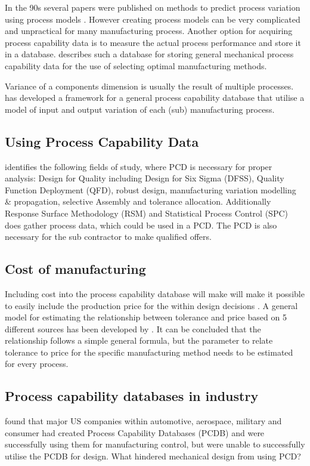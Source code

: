 \documentclass[aip,amsmath, reprint, author-year]{revtex4-1}
\begin{document}
In the 90s several papers were published on methods to predict process variation using process models \citep{thornton2000use}. 
However creating process models can be very complicated and unpractical for many manufacturing process. 
Another option for acquiring process capability data is to measure the actual process performance and store it in a database. \cite{perzyk1998selection} describes such a database for storing general mechanical process capability data for the use of selecting optimal manufacturing methods.

Variance of a components dimension is usually the result of multiple processes. 
 \cite{kern2003forecasting} has developed a framework for a general process capability database that utilise a model of input and output variation of each (sub) manufacturing process. 

\subsection{Using Process Capability Data}
\cite{kern2003forecasting} identifies the following fields of study, where PCD is necessary for proper analysis: Design for Quality including Design for Six Sigma (DFSS), Quality Function Deployment (QFD), robust design, manufacturing variation modelling \& propagation, selective Assembly and tolerance allocation. 
Additionally Response Surface Methodology (RSM) and Statistical Process Control (SPC) does gather process data, which could be used in a PCD. 
The PCD is also necessary for the sub contractor to make qualified offers.


\subsection{Cost of manufacturing}
Including cost into the process capability database will make will make it possible to easily include the production price for the within design decisions \citep{perzyk1998selection, thornton2000use}. 
A general model for estimating the relationship between tolerance and price based on 5 different sources has been developed by \cite{sfantsikopoulos1990cost}.
It can be concluded that the relationship follows a simple general formula, but the parameter to relate tolerance to price for the specific manufacturing method needs to be estimated for every process. 

\subsection{Process capability databases in industry}
\cite{tata1999effective, tata1999process} found that major US companies within automotive, aerospace, military and consumer had created Process Capability Databases (PCDB) and were successfully using them for manufacturing control, but were unable to successfully utilise the PCDB for design. 
What hindered mechanical design from using PCD? 
\end{document}
